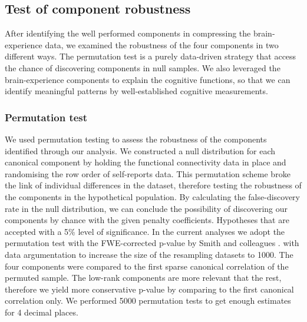 \subsection{Test of component robustness}
\label{study2:method:robust}
After identifying the well performed components in compressing the brain-experience data, we examined the robustness of the four components in two different ways. The permutation test is a purely data-driven strategy that access the chance of discovering components in null samples. We also leveraged the brain-experience components to explain the cognitive functions, so that we can identify meaningful patterns by well-established cognitive measurements. 

\subsubsection{Permutation test}
\label{study2:method:permute}
We used permutation testing to assess the robustness of the components identified through our analysis. We constructed a null distribution for each canonical component by holding the functional connectivity data in place and randomising the row order of self-reports data. This permutation scheme broke the link of individual differences in the dataset, therefore testing the robustness of the components in the hypothetical population. By calculating the false-discovery rate in the null distribution, we can conclude the possibility of discovering our components by chance with the given penalty coefficients. Hypotheses that are accepted with a 5\% level of significance. In the current analyses we adopt the permutation test with the FWE-corrected p-value by Smith and colleagues \citeyear{Smith2015}.
with data argumentation to increase the size of the resampling datasets to 1000. The four components were compared to the first sparse canonical correlation of the permuted sample. The low-rank components are more relevant that the rest, therefore we yield more conservative p-value by comparing to the first canonical correlation only. We performed 5000 permutation tests to get enough estimates for 4 decimal places. 

